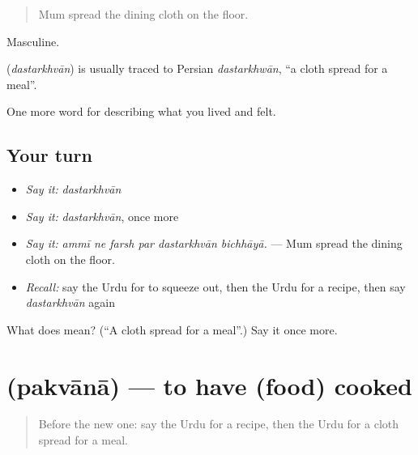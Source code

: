 \begin{quote}
Mum spread the dining cloth on the floor.
\end{quote}

Masculine.

\begin{cousinweb}
\textbf{} (\emph{dastarkhvān}) is usually traced to Persian \emph{dastarkhwān}, \textquotedblleft{}a cloth spread for a meal\textquotedblright{}.
\end{cousinweb}

\begin{grammarlens}[title={What you've built}]
One more word for describing what you lived and felt.
\end{grammarlens}

\subsection*{Your turn}
\begin{itemize}
\raggedright
  \item \emph{Say it:} \emph{dastarkhvān}
  \item \emph{Say it:} \emph{dastarkhvān}, once more
  \item \emph{Say it:} \emph{ammī ne farsh par dastarkhvān bichhāyā.} — Mum spread the dining cloth on the floor.
  \item \emph{Recall:} say the Urdu for to squeeze out, then the Urdu for a recipe, then say \emph{dastarkhvān} again
\end{itemize}

\begin{tcolorbox}[breakable,colback=teal!4,colframe=teal!35!black,title={Before you move on}]
What does  mean? (\textquotedblleft{}A cloth spread for a meal\textquotedblright{}.) Say it once more.
\end{tcolorbox}
\section[\texorpdfstring{\ur{پکوانا} (pakvānā)}{پکوانا (pakvānā)}]{ (pakvānā) — to have (food) cooked}

\label{lesson:UR-C511-pakvana}



\begin{quote}
Before the new one: say the Urdu for a recipe, then the Urdu for a cloth spread for a meal.
\end{quote}

